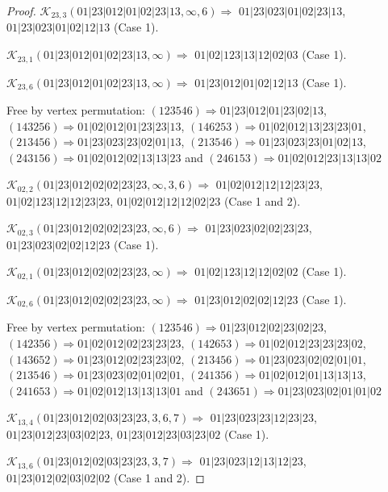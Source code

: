 \documentclass[12pt]{article}
\theoremstyle{plain}
\theoremstyle{definition}
\theoremstyle{remark}
\newcommand{\fancy}[1]{\mathcal{#1}}
\def\K{\fancy{K}}
\begin{document}
\begin{proof}
	$\K_{23,3}(01|23|012|01|02|23|13,\infty,6)\Rightarrow $ $01|23|023|01|02|23|13$, $01|23|023|01|02|12|13$ (Case 1).
	
	$\K_{23,1}(01|23|012|01|02|23|13,\infty)\Rightarrow $ $01|02|123|13|12|02|03$ (Case 1).
	
	$\K_{23,6}(01|23|012|01|02|23|13,\infty)\Rightarrow $ $01|23|012|01|02|12|13$ (Case 1).
	
	
	
	Free by vertex permutation: $(1 2 3 5 4 6)\Rightarrow 01|23|012|01|23|02|13$, $(1 4 3 2 5 6)\Rightarrow 01|02|012|01|23|23|13$, $(1 4 6 2 5 3)\Rightarrow 01|02|012|13|23|23|01$, $(2 1 3 4 5 6)\Rightarrow 01|23|023|23|02|01|13$, $(2 1 3 5 4 6)\Rightarrow 01|23|023|23|01|02|13$, $(2 4 3 1 5 6)\Rightarrow 01|02|012|02|13|13|23$ and $(2 4 6 1 5 3)\Rightarrow 01|02|012|23|13|13|02$
	
	
	
	\bigskip
	
	$\K_{02,2}(01|23|012|02|02|23|23,\infty,3, 6)\Rightarrow $ $01|02|012|12|12|23|23$, $01|02|123|12|12|23|23$, $01|02|012|12|12|02|23$ (Case 1 and 2).
	
	$\K_{02,3}(01|23|012|02|02|23|23,\infty,6)\Rightarrow $ $01|23|023|02|02|23|23$, $01|23|023|02|02|12|23$ (Case 1).
	
	$\K_{02,1}(01|23|012|02|02|23|23,\infty)\Rightarrow $ $01|02|123|12|12|02|02$ (Case 1).
	
	$\K_{02,6}(01|23|012|02|02|23|23,\infty)\Rightarrow $ $01|23|012|02|02|12|23$ (Case 1).
	
	
	
	Free by vertex permutation: $(1 2 3 5 4 6)\Rightarrow 01|23|012|02|23|02|23$, $(1 4 2 3 5 6)\Rightarrow 01|02|012|02|23|23|23$, $(1 4 2 6 5 3)\Rightarrow 01|02|012|23|23|23|02$, $(1 4 3 6 5 2)\Rightarrow 01|23|012|02|23|23|02$, $(2 1 3 4 5 6)\Rightarrow 01|23|023|02|02|01|01$, $(2 1 3 5 4 6)\Rightarrow 01|23|023|02|01|02|01$, $(2 4 1 3 5 6)\Rightarrow 01|02|012|01|13|13|13$, $(2 4 1 6 5 3)\Rightarrow 01|02|012|13|13|13|01$ and $(2 4 3 6 5 1)\Rightarrow 01|23|023|02|01|01|02$
	
	
	
	\bigskip
	
	$\K_{13,4}(01|23|012|02|03|23|23,3, 6, 7)\Rightarrow $ $01|23|023|23|12|23|23$, $01|23|012|23|03|02|23$, $01|23|012|23|03|23|02$ (Case 1).
	
	$\K_{13,6}(01|23|012|02|03|23|23,3, 7)\Rightarrow $ $01|23|023|12|13|12|23$, $01|23|012|02|03|02|02$ (Case 1 and 2).
	

\end{proof}
\end{document}

